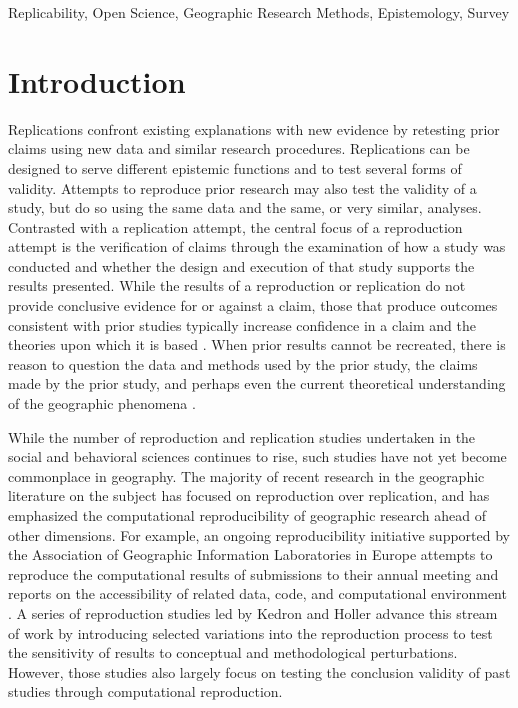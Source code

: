 \documentclass[]{interact}
\theoremstyle{plain}%
\theoremstyle{definition}
\theoremstyle{remark}
\begin{document}
\begin{keywords}
Replicability, Open Science, Geographic Research Methods, Epistemology, Survey
\end{keywords}

\newpage
\section*{Introduction}
Replications confront existing explanations with new evidence by retesting prior claims using new data and similar research procedures.
Replications can be designed to serve different epistemic functions and to test several forms of validity.
Attempts to reproduce prior research may also test the validity of a study, but do so using the same data and the same, or very similar, analyses. 
Contrasted with a replication attempt, the central focus of a reproduction attempt is the verification of claims through the examination of how a study was conducted and whether the design and execution of that study supports the results presented.
While the results of a reproduction or replication do not provide conclusive evidence for or against a claim, those that produce outcomes consistent with prior studies typically increase confidence in a claim and the theories upon which it is based \citep{earp2015, nichols2021}. 
When prior results cannot be recreated, there is reason to question the data and methods used by the prior study, the claims made by the prior study, and perhaps even the current theoretical understanding of the geographic phenomena \citep{christensen2019, NASEM2019}.

While the number of reproduction and replication studies undertaken in the social and behavioral sciences continues to rise, such studies have not yet become commonplace in geography.
The majority of recent research in the geographic literature on the subject has focused on reproduction over replication, and has emphasized the computational reproducibility of geographic research ahead of other dimensions.
For example, an ongoing reproducibility initiative supported by the Association of Geographic Information Laboratories in Europe attempts to reproduce the computational results of submissions to their annual meeting and reports on the accessibility of related data, code, and computational environment \citep{nust2018, ostermann2021}.
A series of reproduction studies led by Kedron and Holler \citep{Kedron2023Beyond, Kedron_Holler_Bardin_Hilgendorf_2022} advance this stream of work by introducing selected variations into the reproduction process to test the sensitivity of results to conceptual and methodological perturbations. 
However, those studies also largely focus on testing the conclusion validity of past studies through computational reproduction. 
\end{document}
